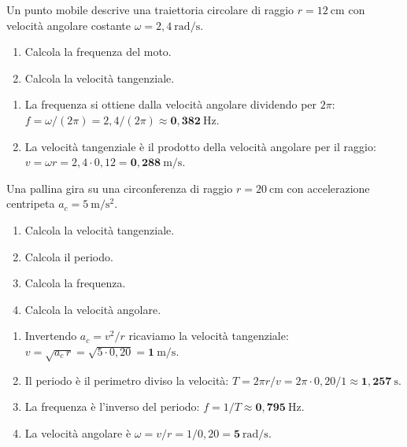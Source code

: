 
\begin{question}[ID=1.11, subtitle={Punto su traiettoria circolare con ω = 2,4 rad/s}, tags={moto circolare, velocità angolare}, difficulty=facile]
Un punto mobile descrive una traiettoria circolare di raggio $r = 12\ \mathrm{cm}$ con velocità angolare costante $\omega = 2{,}4\ \mathrm{rad/s}$.
\begin{enumerate}
\item Calcola la frequenza del moto.
\item Calcola la velocità tangenziale.
\end{enumerate}
\begin{solution}
\begin{enumerate}
\item La frequenza si ottiene dalla velocità angolare dividendo per $2\pi$: $f = \omega/(2\pi) = 2{,}4/(2\pi) \approx \mathbf{0{,}382\ \mathrm{Hz}}$.
\item La velocità tangenziale è il prodotto della velocità angolare per il raggio: $v = \omega r = 2{,}4\cdot 0{,}12 = \mathbf{0{,}288\ \mathrm{m/s}}$.
\end{enumerate}
\end{solution}
\end{question}


\begin{question}[ID=1.12, subtitle={Pallina su cerchio con accelerazione centripeta 5 m/s²}, tags={moto circolare, accelerazione centripeta}, difficulty=media]
Una pallina gira su una circonferenza di raggio $r = 20\ \mathrm{cm}$ con accelerazione centripeta $a_c = 5\ \mathrm{m/s^2}$.
\begin{enumerate}
\item Calcola la velocità tangenziale.
\item Calcola il periodo.
\item Calcola la frequenza.
\item Calcola la velocità angolare.
\end{enumerate}
\begin{solution}
\begin{enumerate}
\item Invertendo $a_c = v^2/r$ ricaviamo la velocità tangenziale: $v = \sqrt{a_c\,r} = \sqrt{5\cdot 0{,}20} = \mathbf{1\ \mathrm{m/s}}$.
\item Il periodo è il perimetro diviso la velocità: $T = 2\pi r/v = 2\pi\cdot 0{,}20/1 \approx \mathbf{1{,}257\ \mathrm{s}}$.
\item La frequenza è l'inverso del periodo: $f = 1/T \approx \mathbf{0{,}795\ \mathrm{Hz}}$.
\item La velocità angolare è $\omega = v/r = 1/0{,}20 = \mathbf{5\ \mathrm{rad/s}}$.
\end{enumerate}
\end{solution}
\end{question}

